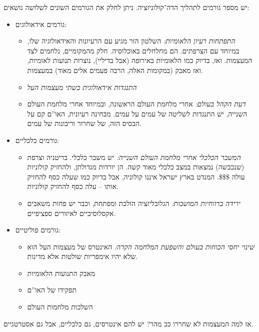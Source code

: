 \documentclass[]{../../../../tex/classes/styledArticle}
\begin{document}
	יש מספר גורמים לתהליך הדה־קולוניזציה. ניתן לחלק את הגורמים השונים לשלושה נושאים: 
	\begin{itemize}
		\item גורמים אידאולוגים: 
		\begin{itemize}
			\item \textit{התפתחות רעיון הלאומיות:} השלטון הזר מגיע עם הרעיונות והאידאולוגיה שלו, במיוחד עם הצרפתים. הם מחלחלים באוכלוסיה. חלק מהמקומיים, נלחמים לצד המעצמות. ואז, בדיוק כמו הלאומיות באירופה (אבל בדיליי), נוצרות תנועות לאומיות, ואז מאבק (במקומות האלה, הרבה פעמים אלים מאוד) במעצמות. 
			\item \textit{התנגדות אידאולוגית בשתי מעצמות העל}
			\item \textit{דעת הקהל בעולם:} אחרי מלחמת העולם הראשונה, ובמיוחד אחרי מלחמת העולם השנייה, יש התנגדות לשליטה של עמים על עמים. מבחינה רעיונית, האו''ם קם על הבסיס הזה, של שחרור וריבונות של עמים. 
		\end{itemize}
		\item גורמים כלכליים: 
		\begin{itemize}
			\item \textit{המשבר הכלכלי אחרי מלחמת העולם השנייה: }יש משבר כלכלי. בריטניה וצרפת (שנכבשה) נמצאות במצב כלכלי מאוד קשה. הן יורדות מגדולתן, ולהחזיק קולוניות עולה \$\$\$. המנדט בארץ ישראל איננו קולוניה, אבל בדיוק כמו שעלה כסף להחזיק אותו – עלה כסף להחזיק קולוניות. 
			\item \textit{ירידה ברווחיות המושבות: }הגלובליזציה הולכת ומפתחת, וכבר יש פחות משאבים אקסלוסיביים לאיזורים ספציפיים. 
		\end{itemize}
		\item גורמים פוליטיים: 
		\begin{itemize}
			\item \textit{שינוי יחסי הכוחות בעולם והשפעת המלחמה הקרה:} האינטרס של מעצמות העל הוא שלא יהיו אימפריות שולטות אלא מדינות. 
			\item מאבק התנועות הלאומיות
			\item תפקידו של האו''ם
			\item השלכות מלחמות העולם
		\end{itemize}
	\end{itemize}
	
	אז למה המעצמות לא שחררו ככ מהר? יש להם אינטרסים, גם כלכליים, אבל גם אסטרטגיים. 
	
\end{document}
